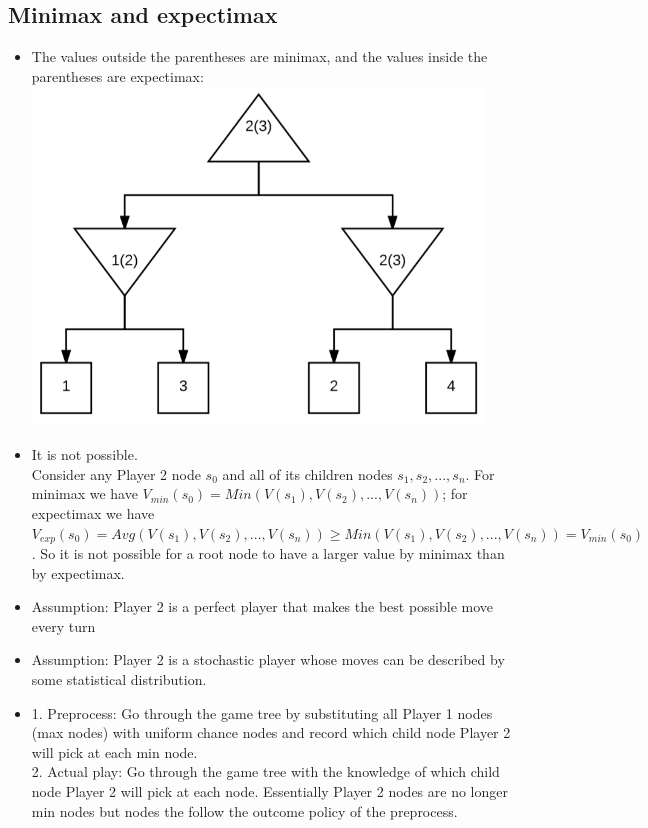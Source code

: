 \documentclass[11pt]{article}
\begin{document}
\begin{onehalfspace}
\section{Minimax and expectimax}
\begin{itemize}
\item The values outside the parentheses are minimax, and the values inside the parentheses are expectimax:\\
\includegraphics[width=12cm, height=9cm]{2_1.png}\\
\item
It is not possible.\\
Consider any Player 2 node $s_0$ and all of its children nodes $s_1,s_2,...,s_n$. For minimax we have $V_{min}(s_0) = Min(V(s_1), V(s_2), ..., V(s_n))$; for expectimax we have $V_{exp}(s_0) = Avg(V(s_1), V(s_2), ..., V(s_n)) \geq Min(V(s_1), V(s_2), ..., V(s_n)) = V_{min}(s_0)$. So it is not possible for a root node to have a larger value by minimax than by expectimax.\\
\item
Assumption: Player 2 is a perfect player that makes the best possible move every turn\\
\item
Assumption: Player 2 is a stochastic player whose moves can be described by some statistical distribution.\\
\item
1. Preprocess: Go through the game tree by substituting all Player 1 nodes (max nodes) with uniform chance nodes and record which child node Player 2 will pick at each min node.\\
2. Actual play: Go through the game tree with the knowledge of which child node Player 2 will pick at each node. Essentially Player 2 nodes are no longer min nodes but nodes the follow the outcome policy of the preprocess.\\
\end{itemize}

\end{onehalfspace}
\end{document}
